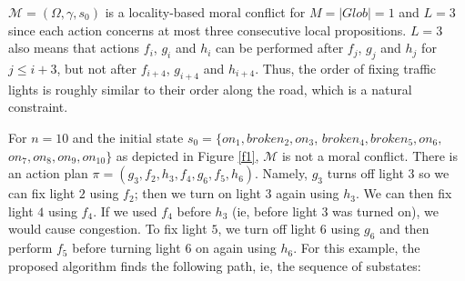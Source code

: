 \documentclass[]{jair}
\begin{document}
$\mathcal{M}=(\Omega,\gamma,s_0)$ is a locality-based moral conflict for $M=|Glob|=1$ and $L=3$ since
each action concerns at most three consecutive local propositions. 
$L=3$ also means that actions $f_i$, $g_i$ and $h_i$ can be performed after $f_{j}$, $g_{j}$ and $h_{j}$ for
$j\le i+3$, but not after $f_{i+4}$, $g_{i+4}$ and $h_{i+4}$. Thus, the order of fixing traffic lights is roughly similar to their order along the road, which is a natural constraint.

For $n=10$ and the initial state $s_0=\{on_1, broken_2, on_3$, $broken_4, broken_5, on_6,$ $on_7, on_8, on_9, on_{10}\}$ as depicted
in Figure \ref{f1}, $\mathcal{M}$ is not a moral conflict.
There is an action plan $\pi=(g_3, f_2, h_3, f_4, g_6, f_5, h_6)$.
Namely, $g_3$ turns off light $3$ so we can fix light $2$ using $f_2$;
then we turn on light $3$ again using $h_3$. We can then fix light $4$ using $f_4$.
If we used $f_4$ before $h_3$ (ie, before light 3 was turned on), we would cause congestion. 
To fix light $5$, we turn off light $6$ using $g_6$ and then perform $f_5$ before turning light $6$ on again using $h_6$. For this example, the proposed algorithm finds the following path, ie, the sequence of substates:
\end{document}
